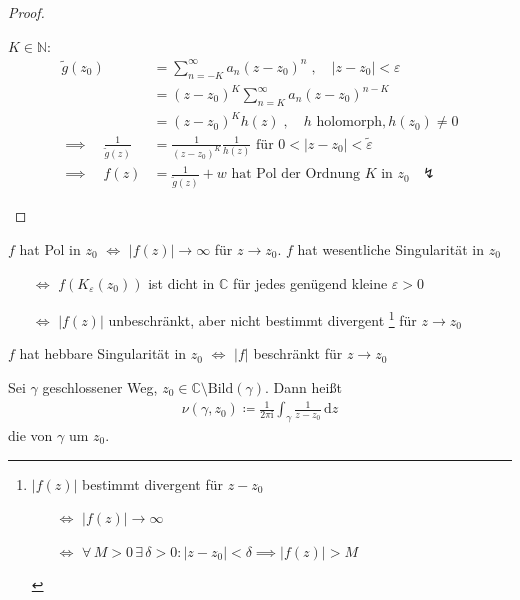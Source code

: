 \documentclass[a4paper,10pt]{scrbook}
\begin{document}
\begin{theorem}
\begin{proof}
\begin{enum-alph}
      \item $K \in \mathbb{N}$:
      \begin{align*}
        \widetilde{g}(z_0)
        &= \sum\limits_{n=-K}^{\infty} a_n (z-z_0)^n \; , \quad |z-z_0| < \varepsilon \\
        &= (z-z_0)^K \sum\limits_{n=K}^{\infty} a_n (z-z_0)^{n-K} \\
        &= (z-z_0)^K h(z) \; , \quad h \text{ holomorph}, h(z_0) \neq 0 \\
        \implies \quad \frac{1}{\widetilde{g}(z)} &= \frac{1}{(z-z_0)^K} \frac{1}{h(z)} \text{ für } 0 < |z-z_0| < \widetilde{\varepsilon} \\
        \implies \quad f(z) &= \frac{1}{\widetilde{g}(z)} + w \text{ hat Pol der Ordnung $K$ in $z_0$ $\lightning$}
      \end{align*}
    \end{enum-alph}
  \end{proof}
\end{theorem}

\begin{notice}[Folgerung:] \label{thm:4.8}
  $f$ hat Pol in $z_0$ $\iff$ $|f(z)| \to \infty$ für $z \to z_0$. $f$ hat wesentliche Singularität in $z_0$
  \begin{itemize}
    \item[$\iff$] $f(K_\varepsilon(z_0))$ ist dicht in $\mathbb{C}$ für jedes genügend kleine $\varepsilon > 0$

    \item[$\iff$] $|f(z)|$ unbeschränkt, aber nicht bestimmt divergent
    \footnote{
      $|f(z)|$ bestimmt divergent für $z-z_0$
      \begin{itemize}
        \item[$\iff$] $|f(z)| \to \infty$
        \item[$\iff$] $\forall \, M > 0 \, \exists \, \delta > 0 : |z-z_0| < \delta \implies |f(z)| > M$
      \end{itemize}
    }
    für $z \to z_0$
  \end{itemize}
  $f$ hat hebbare Singularität in $z_0$ $\iff$ $|f|$ beschränkt für $z \to z_0$
\end{notice}

\begin{theorem}[Definition]
  Sei $\gamma$ geschlossener Weg, $z_0 \in \mathbb{C} \setminus \mathrm{Bild}(\gamma)$. Dann heißt
  \begin{align*}
    \nu(\gamma,z_0) \coloneq \frac{1}{2 \pi \mathrm{i}} \int_\gamma \frac{1}{z-z_0} \, \mathrm{d}z
  \end{align*}
  die  von $\gamma$ um $z_0$.
\end{theorem}
\end{document}
